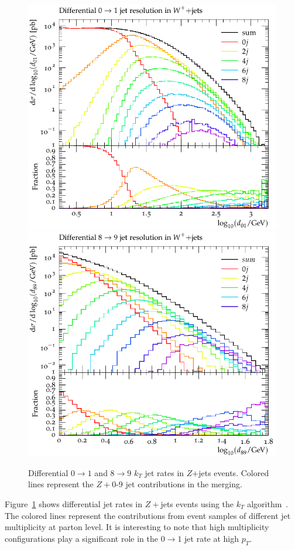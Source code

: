 \documentclass[aps,prd,twocolumn,fleqn,superscriptaddress,groupedaddress,nofootinbib,preprintnumbers]{revtex4}
\begin{document}
\begin{figure}[t]
    \centering
    \includegraphics[width=\linewidth]{fig/zj/PP_JetRates/log10_d_01.pdf}
    \includegraphics[width=\linewidth]{fig/zj/PP_JetRates/log10_d_89.pdf}
    \caption{Differential $0\to 1$ and $8\to 9$ $k_T$ jet rates in $Z$+jets events.
      Colored lines represent the $Z+0$-$9$ jet contributions in the merging.}
    \label{fig:jetrates}
\end{figure}
Figure~\ref{fig:jetrates} shows differential jet rates in $Z+$jets events
using the $k_T$ algorithm~\cite{Catani:1993hr}. The colored lines represent the
contributions from event samples of different jet multiplicity at parton level.
It is interesting to note that high multiplicity configurations play
a significant role in the $0\to 1$ jet rate at high $p_T$.
\end{document}
